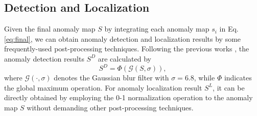 \documentclass[default,iicol]{sn-jnl}\usepackage[algo2e,ruled,linesnumbered]{algorithm2e}
\theoremstyle{thmstyleone}\newtheorem{theorem}{Theorem}\newtheorem{proposition}[theorem]{Proposition}
\theoremstyle{thmstyletwo}\newtheorem{example}{Example}\newtheorem{remark}{Remark}
\theoremstyle{thmstylethree}\newtheorem{definition}{Definition}
\begin{document}
\subsection{Detection and Localization}
Given the final anomaly map $S$ by integrating each anomaly map $s_{i}$ in Eq. \ref{eq:final}, we can obtain anomaly detection and localization results by some frequently-used post-processing techniques.
Following the previous works \cite{patchcore,SPADE,Padim}, the anomaly detection results $S^{D}$ are calculated by
\begin{equation}
    S^{D} = \varPhi(\mathcal{G}(S, \sigma)),
\end{equation}
where $\mathcal{G}(\cdot, \sigma)$ denotes the Gaussian blur filter with $\sigma=6.8$, while $\varPhi$ indicates the global maximum operation.
For anomaly localization result $S^{L}$, it can be directly obtained by employing the 0-1 normalization operation to the anomaly map $S$ without demanding other post-processing techniques.
\end{document}
